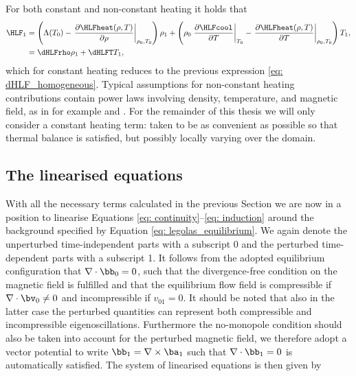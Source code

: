 For both constant and non-constant heating it holds that
\begin{equation} \label{eq: perturbed_HLF}
  \begin{aligned}
    \HLF_1 &= \left(
      \Lambda(T_0) - \left.\frac{\partial \HLFheat(\rho, T)}{\partial \rho}\right|_{\rho_0, T_0}
    \right)\rho_1 + \left(
      \rho_0 \left.\frac{\partial \HLFcool}{\partial T}\right|_{T_0}
      - \left.\frac{\partial \HLFheat(\rho, T)}{\partial T}\right|_{\rho_0, T_0}
    \right) T_1, \\
          &= \dHLFrho \rho_1 + \dHLFT T_1,
  \end{aligned}
\end{equation}
which for constant heating reduces to the previous expression \eqref{eq: dHLF_homogeneous}. Typical assumptions for non-constant heating contributions contain power laws involving density, temperature, and magnetic field, as in for example \citet{kolotkov2019} and \citet{duckenfield2021}. For the remainder of this thesis we will only consider a constant heating term: taken to be as convenient as possible so that thermal balance is satisfied, but possibly locally varying over the domain.

\subsection{The linearised equations}
With all the necessary terms calculated in the previous Section we are now in a position to linearise Equations \eqref{eq: continuity}--\eqref{eq: induction} around the background specified by Equation \eqref{eq: legolas_equilibrium}. We again denote the unperturbed time-independent parts with a subscript 0 and the perturbed time-dependent parts with a subscript 1. It follows from the adopted equilibrium configuration that $\nabla \cdot \bb_0 = 0$, such that the divergence-free condition on the magnetic field is fulfilled and that the equilibrium flow field is compressible if
$\nabla \cdot \bv_0 \neq 0$ and incompressible if $v_{01} = 0$. It should be noted that also in the latter case the perturbed quantities can represent both compressible and incompressible eigenoscillations. Furthermore the no-monopole condition should also be taken into account for the perturbed magnetic field, we therefore adopt a vector potential to write $\bb_1 = \nabla \times \ba_1$ such that $\nabla \cdot \bb_1 = 0$ is automatically satisfied. The system of linearised equations is then given by

